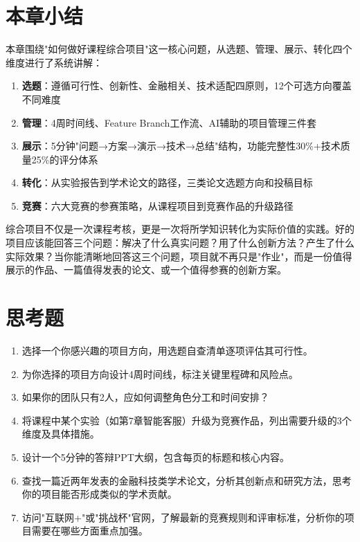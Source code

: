 \section{本章小结}

本章围绕"如何做好课程综合项目"这一核心问题，从选题、管理、展示、转化四个维度进行了系统讲解：

\begin{enumerate}[leftmargin=2em]
  \item \textbf{选题}：遵循可行性、创新性、金融相关、技术适配四原则，12个可选方向覆盖不同难度
  \item \textbf{管理}：4周时间线、Feature Branch工作流、AI辅助的项目管理三件套
  \item \textbf{展示}：5分钟"问题→方案→演示→技术→总结"结构，功能完整性30\%+技术质量25\%的评分体系
  \item \textbf{转化}：从实验报告到学术论文的路径，三类论文选题方向和投稿目标
  \item \textbf{竞赛}：六大竞赛的参赛策略，从课程项目到竞赛作品的升级路径
\end{enumerate}

\begin{theorybox}
综合项目不仅是一次课程考核，更是一次将所学知识转化为实际价值的实践。好的项目应该能回答三个问题：解决了什么真实问题？用了什么创新方法？产生了什么实际效果？当你能清晰地回答这三个问题，项目就不再只是"作业"，而是一份值得展示的作品、一篇值得发表的论文、或一个值得参赛的创新方案。
\end{theorybox}

\section{思考题}

\begin{exercisebox}[本章思考题]
\begin{enumerate}[leftmargin=2em]
  \item 选择一个你感兴趣的项目方向，用选题自查清单逐项评估其可行性。
  \item 为你选择的项目方向设计4周时间线，标注关键里程碑和风险点。
  \item 如果你的团队只有2人，应如何调整角色分工和时间安排？
  \item 将课程中某个实验（如第7章智能客服）升级为竞赛作品，列出需要升级的3个维度及具体措施。
  \item 设计一个5分钟的答辩PPT大纲，包含每页的标题和核心内容。
  \item 查找一篇近两年发表的金融科技类学术论文，分析其创新点和研究方法，思考你的项目能否形成类似的学术贡献。
  \item 访问"互联网+"或"挑战杯"官网，了解最新的竞赛规则和评审标准，分析你的项目需要在哪些方面重点加强。
\end{enumerate}
\end{exercisebox}

